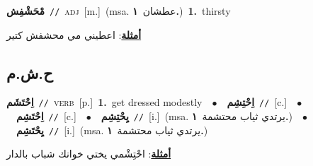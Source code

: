\documentclass[10pt,a4paper,twoside]{article} %
\begin{document}
\begin{multicols}{2}
{\setlength\topsep{0pt}\textbf{\foreignlanguage{arabic}{مْحَشْفِش}}\ {\color{gray}\texttt{//}\color{black}}\ \textsc{adj}\ [m.]\ \color{gray}(msa. \foreignlanguage{arabic}{عطشان}~\foreignlanguage{arabic}{\textbf{١.}})\color{black}\ \textbf{1.}~thirsty\  \begin{flushright}\color{gray}\foreignlanguage{arabic}{\textbf{\underline{\foreignlanguage{arabic}{أمثلة}}}: اعطيني مي محشفش كتير}\end{flushright}\color{black}} \vspace{2mm}

\vspace{-3mm}
\subsection*{\color{blue}\foreignlanguage{arabic}{ح.ش.م}\color{blue}{}} 

{\setlength\topsep{0pt}\textbf{\foreignlanguage{arabic}{اِحْتَشَم}}\ {\color{gray}\texttt{//}\color{black}}\ \textsc{verb}\ [p.]\ \textbf{1.}~get dressed modestly\ \ $\bullet$\ \ \setlength\topsep{0pt}\textbf{\foreignlanguage{arabic}{اِحْتِشِم}}\ {\color{gray}\texttt{//}\color{black}}\ [c.]\ \ $\bullet$\ \ \setlength\topsep{0pt}\textbf{\foreignlanguage{arabic}{اِحْتَشِم}}\ {\color{gray}\texttt{//}\color{black}}\ [c.]\ \ $\bullet$\ \ \setlength\topsep{0pt}\textbf{\foreignlanguage{arabic}{يِحْتِشِم}}\ {\color{gray}\texttt{//}\color{black}}\ [i.]\ \color{gray}(msa. \foreignlanguage{arabic}{يرتدي ثياب محتشمة}~\foreignlanguage{arabic}{\textbf{١.}})\color{black}\ \ $\bullet$\ \ \setlength\topsep{0pt}\textbf{\foreignlanguage{arabic}{يِحْتَشِم}}\ {\color{gray}\texttt{//}\color{black}}\ [i.]\ \color{gray}(msa. \foreignlanguage{arabic}{يرتدي ثياب محتشمة}~\foreignlanguage{arabic}{\textbf{١.}})\color{black}\  \begin{flushright}\color{gray}\foreignlanguage{arabic}{\textbf{\underline{\foreignlanguage{arabic}{أمثلة}}}: احْتِشْمي يختي خوانك شباب بالدار}\end{flushright}\color{black}} \vspace{2mm}


\end{multicols}
\end{document}
